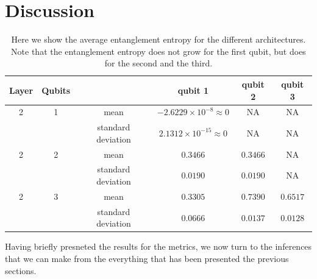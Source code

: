 \documentclass{article}
\begin{document}
\section{Discussion}
\begin{table}
    \centering
    \begin{tabular}{|c|c|c|c|c|c|}
        \hline
        Layer & Qubits&  & qubit 1 & qubit 2 & qubit 3 \\
        \hline 
        2 & 1 & mean & $-2.6229 \times 10^{-8} \approx 0$ & NA & NA\\
        & & standard deviation & $2.1312\times 10^{-15} \approx 0$ & NA & NA \\
        \hline 
        2 &2 & mean & $0.3466$  & $0.3466$ & NA\\
        & & standard deviation & $0.0190$ & $0.0190$ & NA \\
        \hline 
        2 & 3 & mean & $0.3305$ & $0.7390$ & $0.6517$\\
        & & standard deviation & $0.0666$ & $0.0137$ & $0.0128$ \\
        \hline
    \end{tabular}
    \caption{Here we show the average entanglement entropy for the different architectures. Note that the entanglement entropy does not grow for the first qubit, but does for the second and the third.}
    \label{tab:average_entanglement_table}
\end{table}
Having briefly presneted the results for the metrics, we now turn to the inferences that we can make from the everything that has been presented the previous sections.  
\end{document}
